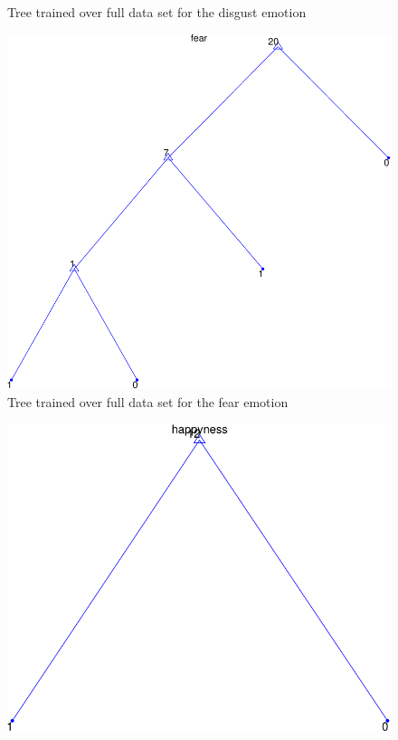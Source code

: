 \documentclass[a4paper]{article}
\begin{document}
\begin{itemize}
\begin{figure}[h]
    \caption{Tree trained over full data set for the disgust emotion}
  \end{figure}
  \begin{figure}[h]
    \centering
    \includegraphics[scale=0.5]{graph-fear}
    \caption{Tree trained over full data set for the fear emotion}
  \end{figure}
  \begin{figure}[h]
    \centering
    \includegraphics[scale=0.5]{graph-happyness}

\end{figure}
\end{itemize}
\end{document}
